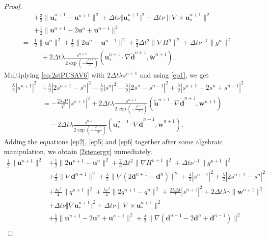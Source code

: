 \documentclass[12pt,reqno]{amsart}
\numberwithin{equation}{section}
\newcommand{\uu}{\mathrm{\textbf{u}}}
\newcommand{\dd}{\mathrm{\textbf{d}}}
\newcommand{\ww}{\mathrm{\textbf{w}}}
\begin{document}
\begin{proof}
\begin{align}
&+\frac{3}{2}\|\uu_*^{n+1}-\uu^{n+1}\|^2+\Delta t\nu\Vert \uu_*^{n+1}\Vert^2+\Delta t\nu\|\nabla\times\uu_*^{n+1}\|^2\nonumber\\
&+\frac{1}{2}\|\uu^{n+1}-2\uu^n+\uu^{n-1}\|^2\nonumber\\
=&\frac{1}{2}\|\uu^{n}\|^2+\frac{1}{2}\|2\uu^{n}-\uu^{n-1}\|^2+\frac{2}{3}\Delta t^2\|\nabla H^{n}\|^2+\Delta t\nu^{-1}\|g^{n}\|^2\nonumber\\
&\quad+2\Delta t\lambda\frac{s^{n+1}}{2\exp\left(-\frac{t^{n+1}}{T}\right)}\left(\uu_*^{n+1}\cdot\nabla\tilde{\dd}^{n+1},\tilde{\ww}^{n+1}\right).
\end{align}
Multiplying \eqref{eq:2stPCSAV6} with $2\Delta t\lambda s^{n+1}$ and using \eqref{ep1}, we get 
\begin{align}\label{ep6}
\frac{\lambda}{2}|s^{n+1}|^2&+\frac{\lambda}{2}|2s^{n+1}-s^{n}|^2-\frac{\lambda}{2}|s^{n}|^2-\frac{\lambda}{2}|2s^{n}-s^{n-1}|^2+\frac{\lambda}{2}|s^{n+1}-2s^n+s^{n-1}|^2\nonumber\\
&=-\frac{2\lambda\Delta t}{T}|s^{n+1}|^2+
2\Delta t\lambda\frac{s^{n+1}}{2\exp\left(-\frac{t^{n+1}}{T}\right)} \left(\tilde{\uu}^{n+1}\cdot\nabla\tilde{\dd}^{n+1},\ww^{n+1}\right)\nonumber\\
&\quad-2\Delta t\lambda\frac{s^{n+1}}{2\exp\left(-\frac{t^{n+1}}{T}\right)} \left(\uu_*^{n+1}\cdot\nabla\tilde{\dd}^{n+1},\tilde{\ww}^{n+1}\right).
\end{align}
Adding the equations \eqref{ep2}, \eqref{ep5} and \eqref{ep6} together after some algebraic manipulation, we obtain \eqref{2stenergy} immediately.
\iffalse
\begin{align}
\frac{1}{2}\|\uu^{n+1}\|^2&+\frac{1}{2}\|2\uu^{n+1}-\uu^n\|^2+\frac{2}{3}\Delta t^2\|\nabla H^{n+1}\|^2+\Delta t\nu^{-1}\|g^{n+1}\|^2\nonumber\\
&+\frac{\lambda}{2}\lVert\nabla\dd^{n+1}\rVert^2
+\frac{\lambda}{2}\lVert\nabla\left(2\dd^{n+1}-\dd^n\right)\rVert^2+\frac{\lambda}{2}|s^{n+1}|^2+\frac{\lambda}{2}|2s^{n+1}-s^{n}|^2\nonumber\\
&+\frac{\lambda\varepsilon^2}{4}\|q^{n+1}\|^2+\frac{\lambda\varepsilon^2}{4}\|2q^{n+1}-q^n\|^2
+\frac{2\lambda\Delta t}{T}|s^{n+1}|^2+2\Delta t\lambda\gamma\|\ww^{n+1}\|^2\nonumber\\
&+\Delta t\nu\Vert \nabla\uu_*^{n+1}\Vert^2+\Delta t\nu\|\nabla\times\uu_*^{n+1}\|^2\nonumber\\
&+\frac{1}{2}\|\uu^{n+1}-2\uu^n+\uu^{n-1}\|^2+\frac{\lambda}{2}\lVert\nabla\left(\dd^{n+1}-2\dd^n+\dd^{n-1}\right)\rVert^2\nonumber\\

\end{align}
\end{proof}
\end{document}
